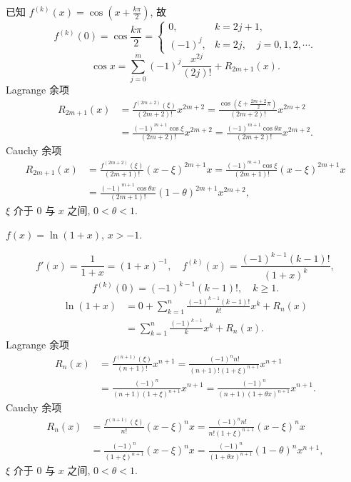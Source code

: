\begin{solution}
已知 $f^{(k)}(x)=\cos\left(x+\frac{k\pi}{2}\right)$, 故
\[
f^{(k)}(0)=\cos\frac{k\pi}{2}=\begin{cases}
0, & k=2j+1,\\
(-1)^{j}, & k=2j,\quad j=0,1,2,\cdots.
\end{cases}
\]
\[
\cos x=\sum_{j=0}^{m}(-1)^{j}\frac{x^{2j}}{(2j)!}+R_{2m+1}(x).
\]
Lagrange 余项
\begin{align*}
R_{2m+1}(x)&=\frac{f^{(2m+2)}(\xi)}{(2m+2)!}x^{2m+2}=\frac{\cos\left(\xi+\frac{2m+2}{2}\pi\right)}{(2m+2)!}x^{2m+2}\\
&=\frac{(-1)^{m+1}\cos\xi}{(2m+2)!}x^{2m+2}=\frac{(-1)^{m+1}\cos\theta x}{(2m+2)!}x^{2m+2}.
\end{align*}
Cauchy 余项
\begin{align*}
R_{2m+1}(x)&=\frac{f^{(2m+2)}(\xi)}{(2m+1)!}(x-\xi)^{2m+1}x=\frac{(-1)^{m+1}\cos\xi}{(2m+1)!}(x-\xi)^{2m+1}x\\
&=\frac{(-1)^{m+1}\cos\theta x}{(2m+1)!}(1-\theta)^{2m+1}x^{2m+2},
\end{align*}
$\xi$ 介于 $0$ 与 $x$ 之间, $0<\theta<1$.
\end{solution}

\begin{example}\label{ex:4.1.5}
$f(x)=\ln(1+x)$, $x>-1$.
\end{example}

\begin{solution}
\[
f'(x)=\frac{1}{1+x}=(1+x)^{-1},\quad f^{(k)}(x)=\frac{(-1)^{k-1}(k-1)!}{(1+x)^{k}},
\]
\[
f^{(k)}(0)=(-1)^{k-1}(k-1)!,\quad k\geqslant 1.
\]
\begin{align*}
\ln(1+x)&=0+\sum_{k=1}^{n}\frac{(-1)^{k-1}(k-1)!}{k!}x^{k}+R_{n}(x)\\
&=\sum_{k=1}^{n}\frac{(-1)^{k-1}}{k}x^{k}+R_{n}(x).
\end{align*}
Lagrange 余项
\begin{align*}
R_{n}(x)&=\frac{f^{(n+1)}(\xi)}{(n+1)!}x^{n+1}=\frac{(-1)^{n}n!}{(n+1)!(1+\xi)^{n+1}}x^{n+1}\\
&=\frac{(-1)^{n}}{(n+1)(1+\xi)^{n+1}}x^{n+1}=\frac{(-1)^{n}}{(n+1)(1+\theta x)^{n+1}}x^{n+1}.
\end{align*}
Cauchy 余项
\begin{align*}
R_{n}(x)&=\frac{f^{(n+1)}(\xi)}{n!}(x-\xi)^{n}x=\frac{(-1)^{n}n!}{n!(1+\xi)^{n+1}}(x-\xi)^{n}x\\
&=\frac{(-1)^{n}}{(1+\xi)^{n+1}}(x-\xi)^{n}x=\frac{(-1)^{n}}{(1+\theta x)^{n+1}}(1-\theta)^{n}x^{n+1},
\end{align*}
$\xi$ 介于 $0$ 与 $x$ 之间, $0<\theta<1$.
\end{solution}

